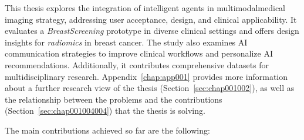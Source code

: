 \textcolor{revised}{This thesis explores the integration of intelligent agents in multimodal\footnotemark[3] medical imaging strategy, addressing user acceptance, design, and clinical applicability.
It evaluates a {\it BreastScreening} prototype in diverse clinical settings and offers design insights for {\it radiomics} in breast cancer.
The study also examines \ac{AI} communication strategies to improve clinical workflows and personalize \ac{AI} recommendations.
Additionally, it contributes comprehensive datasets for multidisciplinary research.
Appendix~\ref{chap:app001} provides more information about a further research view of the thesis (Section~\ref{sec:chap001002}), as well as the relationship between the problems and the contributions (Section~\ref{sec:chap001004004}) that the thesis is solving.}


\noindent
The main contributions achieved so far are the following:

